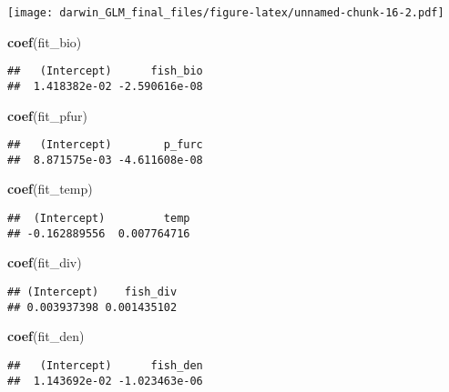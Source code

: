 \documentclass[]{article}
\newenvironment{Shaded}{\begin{snugshade}}{\end{snugshade}}
\newcommand{\KeywordTok}[1]{\textcolor[rgb]{0.13,0.29,0.53}{\textbf{#1}}}
\newcommand{\NormalTok}[1]{#1}
\begin{document}
\texttt{[image: darwin\_GLM\_final\_files/figure-latex/unnamed-chunk-16-2.pdf]}

\begin{Shaded}
\begin{Highlighting}[]
\KeywordTok{coef}\NormalTok{(fit_bio)}
\end{Highlighting}
\end{Shaded}

\begin{verbatim}
##   (Intercept)      fish_bio 
##  1.418382e-02 -2.590616e-08
\end{verbatim}

\begin{Shaded}
\begin{Highlighting}[]
\KeywordTok{coef}\NormalTok{(fit_pfur) }
\end{Highlighting}
\end{Shaded}

\begin{verbatim}
##   (Intercept)        p_furc 
##  8.871575e-03 -4.611608e-08
\end{verbatim}

\begin{Shaded}
\begin{Highlighting}[]
\KeywordTok{coef}\NormalTok{(fit_temp) }
\end{Highlighting}
\end{Shaded}

\begin{verbatim}
##  (Intercept)         temp 
## -0.162889556  0.007764716
\end{verbatim}

\begin{Shaded}
\begin{Highlighting}[]
\KeywordTok{coef}\NormalTok{(fit_div)}
\end{Highlighting}
\end{Shaded}

\begin{verbatim}
## (Intercept)    fish_div 
## 0.003937398 0.001435102
\end{verbatim}

\begin{Shaded}
\begin{Highlighting}[]
\KeywordTok{coef}\NormalTok{(fit_den)}
\end{Highlighting}
\end{Shaded}

\begin{verbatim}
##   (Intercept)      fish_den 
##  1.143692e-02 -1.023463e-06
\end{verbatim}
\end{document}
